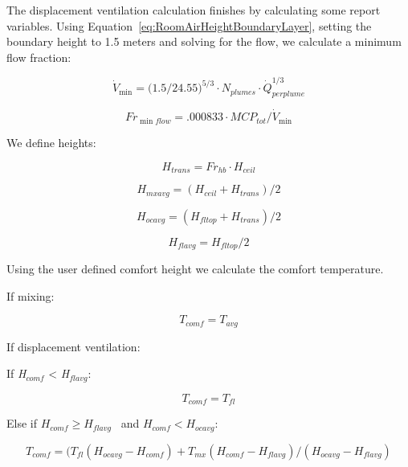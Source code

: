 The displacement ventilation calculation finishes by calculating some report variables. Using Equation~\ref{eq:RoomAirHeightBoundaryLayer}, setting the boundary height to 1.5 meters and solving for the flow, we calculate a minimum flow fraction:

\begin{equation}
{\dot V_{\min }} = {(1.5/{\mathrm{24}}{\mathrm{.55)}}^{{\mathrm{5/3}}}} \cdot {N_{plumes}} \cdot \dot Q_{perplume}^{1/3}
\end{equation}

\begin{equation}
F{r_{\min flow}} = .000833 \cdot MC{P_{tot}}/{\dot V_{\min }}
\end{equation}

We define heights:

\begin{equation}
{H_{trans}} = F{r_{hb}} \cdot {H_{ceil}}
\end{equation}

\begin{equation}
{H_{mxavg}} = ({H_{ceil}} + {H_{trans}})/2
\end{equation}

\begin{equation}
{H_{ocavg}} = ({H_{fltop}} + {H_{trans}})/2
\end{equation}

\begin{equation}
{H_{flavg}} = {H_{fltop}}/2
\end{equation}

Using the user defined comfort height we calculate the comfort temperature.

If mixing:

\begin{equation}
{T_{comf}} = {T_{avg}}
\end{equation}

If displacement ventilation:

If \emph{H\(_{comf}\)} \textless{} \emph{H\(_{flavg}\)}:

\begin{equation}
{T_{comf}} = {T_{fl}}
\end{equation}

Else if \({H_{comf}} \ge {H_{flavg}}\) ~and \({H_{comf}} < {H_{ocavg}}\):

\begin{equation}
{T_{comf}} = ({T_{fl}}({H_{ocavg}} - {H_{comf}}) + {T_{mx}}({H_{comf}} - {H_{flavg}})/({H_{ocavg}} - {H_{flavg}})
\end{equation}

